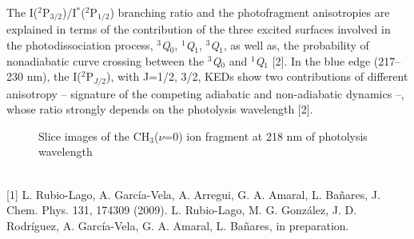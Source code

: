 The I($^{2}$P$_{3/2}$)/I$^{*}$($^{2}$P$_{1/2}$) branching ratio and the photofragment anisotropies are
explained in terms of the contribution of the three excited surfaces involved in the
photodissociation process, $^{3}$\textit{Q}$_{0}$, $^{1}$\textit{Q}$_{1}$, $^{3}$\textit{Q}$_{1}$, as well as, the probability of
nonadiabatic curve crossing between the  $^{3}$\textit{Q}$_{0}$ and  $^{1}$\textit{Q}$_{1}$ [2]. In the blue edge (217–230
nm), the I($^{2}$P$_{J/2}$), with J=1/2, 3/2, KEDs show two contributions of different
anisotropy – signature of the competing adiabatic and non-adiabatic dynamics –,
whose ratio strongly depends on the photolysis wavelength [2].
\\
\begin{figure}[h]
 \centerline{}
 \caption[]{Slice images of the CH$_3$($\nu$=0) ion fragment at 218 nm of photolysis wavelength}\label{figure 1}
\end{figure}
\\
{\footnotesize
[1] L. Rubio-Lago, A. García-Vela, A. Arregui, G. A. Amaral, L. Bañares, J. Chem. Phys. 131,
174309 (2009).
\newline
[2] L. Rubio-Lago, M. G. González, J. D. Rodríguez, A. García-Vela, G. A. Amaral, L. Bañares, in
preparation.
}

\newpage
\setcounter{figure}{0}
